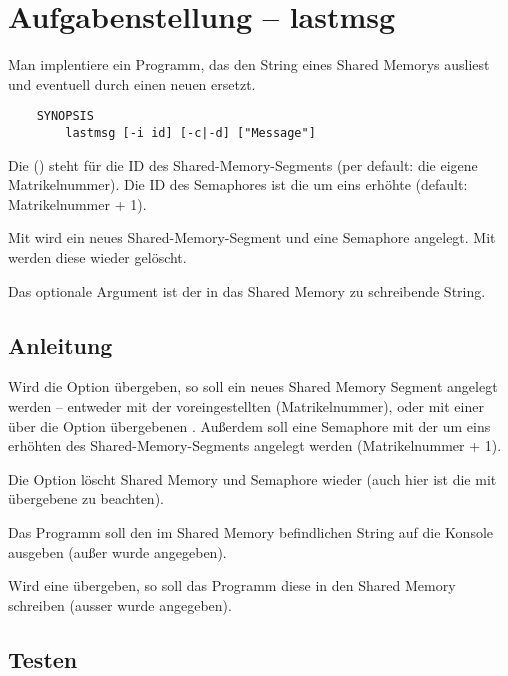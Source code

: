 




\section*{Aufgabenstellung -- lastmsg}

Man implentiere ein Programm, das den String eines Shared Memorys ausliest und
eventuell durch einen neuen ersetzt.

\begin{verbatim}
    SYNOPSIS
        lastmsg [-i id] [-c|-d] ["Message"]
\end{verbatim}

Die  () steht für die ID des Shared-Memory-Segments (per
default: die eigene Matrikelnummer). Die ID des Semaphores ist die um eins
erhöhte (default: Matrikelnummer + 1).

Mit  wird ein neues Shared-Memory-Segment und eine Semaphore
angelegt. Mit  werden diese wieder gelöscht.

Das optionale Argument  ist der in das Shared
Memory zu schreibende String.

\subsection*{Anleitung}

Wird die Option  übergeben, so soll ein neues Shared Memory Segment
angelegt werden -- entweder mit der voreingestellten 
(Matrikelnummer), oder mit einer über die Option  übergebenen
. Außerdem soll eine Semaphore mit der um eins erhöhten 
des Shared-Memory-Segments angelegt werden (Matrikelnummer + 1).

Die Option  löscht Shared Memory und Semaphore wieder (auch hier ist
die mit  übergebene  zu beachten).

Das Programm soll den im Shared Memory befindlichen String auf die Konsole
ausgeben (außer  wurde angegeben).

Wird eine  übergeben, so soll das Programm diese
in den Shared Memory schreiben (ausser  wurde angegeben).

\subsection*{Testen}

